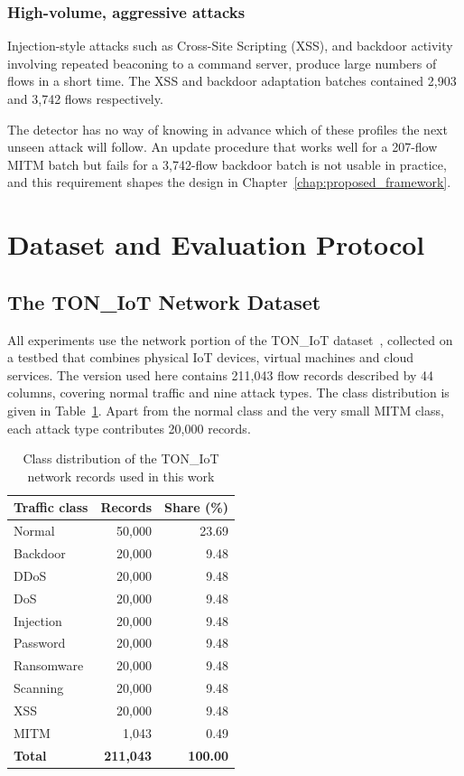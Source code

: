 \subsubsection{High-volume, aggressive attacks}
Injection-style attacks such as Cross-Site Scripting (XSS), and backdoor activity involving repeated beaconing to a command server, produce large numbers of flows in a short time. The XSS and backdoor adaptation batches contained 2{,}903 and 3{,}742 flows respectively.

The detector has no way of knowing in advance which of these profiles the next unseen attack will follow. An update procedure that works well for a 207-flow MITM batch but fails for a 3{,}742-flow backdoor batch is not usable in practice, and this requirement shapes the design in Chapter~\ref{chap:proposed_framework}.

\section{Dataset and Evaluation Protocol}
\label{sec:dataset_protocol}

\subsection{The TON\_IoT Network Dataset}
\label{subsec:toniot}

All experiments use the network portion of the TON\_IoT dataset~\cite{alshammari2020toniot}, collected on a testbed that combines physical IoT devices, virtual machines and cloud services. The version used here contains 211{,}043 flow records described by 44 columns, covering normal traffic and nine attack types. The class distribution is given in Table~\ref{tab:class_distribution}. Apart from the normal class and the very small MITM class, each attack type contributes 20{,}000 records.

\begin{table}[htpb]
\centering
\small
\renewcommand{\arraystretch}{1.3}
\caption{Class distribution of the TON\_IoT network records used in this work}
\label{tab:class_distribution}
\begin{tabular}{|l|r|r|}
\hline
\textbf{Traffic class} & \textbf{Records} & \textbf{Share (\%)} \\ \hline
Normal      & 50{,}000 & 23.69 \\
Backdoor    & 20{,}000 & 9.48 \\
DDoS        & 20{,}000 & 9.48 \\
DoS         & 20{,}000 & 9.48 \\
Injection   & 20{,}000 & 9.48 \\
Password    & 20{,}000 & 9.48 \\
Ransomware  & 20{,}000 & 9.48 \\
Scanning    & 20{,}000 & 9.48 \\
XSS         & 20{,}000 & 9.48 \\
MITM        & 1{,}043  & 0.49 \\ \hline
\textbf{Total} & \textbf{211{,}043} & \textbf{100.00} \\ \hline
\end{tabular}
\end{table}

